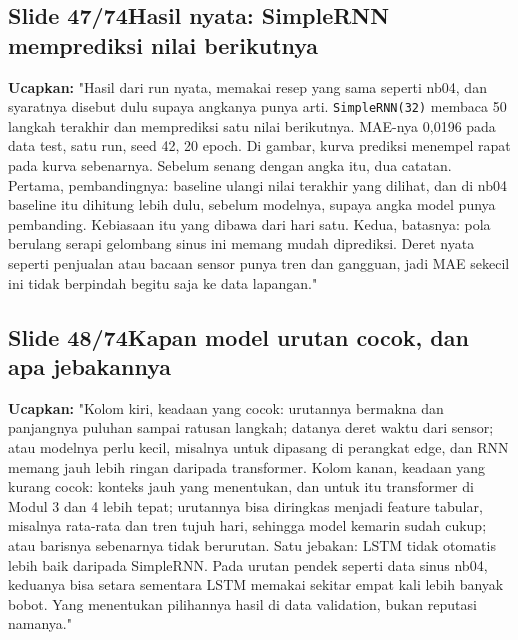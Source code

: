 \documentclass[11pt]{article}
\renewcommand{\framebox}[1]{\colorbox{acc!15}{\textcolor{acc}{\textbf{#1}}}}
\begin{document}
\subsection*{\framebox{Slide 47/74}\quad Hasil nyata: SimpleRNN memprediksi nilai berikutnya}
\textbf{Ucapkan:} "Hasil dari run nyata, memakai resep yang sama seperti nb04, dan syaratnya disebut dulu supaya angkanya punya arti. \texttt{SimpleRNN(32)} membaca 50 langkah terakhir dan memprediksi satu nilai berikutnya. MAE-nya 0,0196 pada data test, satu run, seed 42, 20 epoch. Di gambar, kurva prediksi menempel rapat pada kurva sebenarnya. Sebelum senang dengan angka itu, dua catatan. Pertama, pembandingnya: baseline ulangi nilai terakhir yang dilihat, dan di nb04 baseline itu dihitung lebih dulu, sebelum modelnya, supaya angka model punya pembanding. Kebiasaan itu yang dibawa dari hari satu. Kedua, batasnya: pola berulang serapi gelombang sinus ini memang mudah diprediksi. Deret nyata seperti penjualan atau bacaan sensor punya tren dan gangguan, jadi MAE sekecil ini tidak berpindah begitu saja ke data lapangan."\\[2pt]

\subsection*{\framebox{Slide 48/74}\quad Kapan model urutan cocok, dan apa jebakannya}
\textbf{Ucapkan:} "Kolom kiri, keadaan yang cocok: urutannya bermakna dan panjangnya puluhan sampai ratusan langkah; datanya deret waktu dari sensor; atau modelnya perlu kecil, misalnya untuk dipasang di perangkat edge, dan RNN memang jauh lebih ringan daripada transformer. Kolom kanan, keadaan yang kurang cocok: konteks jauh yang menentukan, dan untuk itu transformer di Modul 3 dan 4 lebih tepat; urutannya bisa diringkas menjadi feature tabular, misalnya rata-rata dan tren tujuh hari, sehingga model kemarin sudah cukup; atau barisnya sebenarnya tidak berurutan. Satu jebakan: LSTM tidak otomatis lebih baik daripada SimpleRNN. Pada urutan pendek seperti data sinus nb04, keduanya bisa setara sementara LSTM memakai sekitar empat kali lebih banyak bobot. Yang menentukan pilihannya hasil di data validation, bukan reputasi namanya."\\[2pt]
\end{document}
